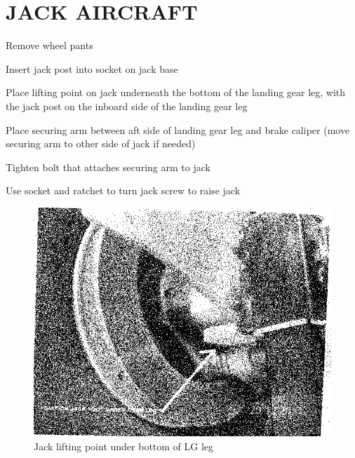 \section{JACK AIRCRAFT}
  \begin{enumerate*}
  	\item Remove wheel pants
    \item Insert jack post into socket on jack base
    \item Place lifting point on jack underneath the bottom of the landing gear leg, with the jack post on the inboard side of the landing gear leg
    \item Place securing arm between aft side of landing gear leg and brake caliper (move securing arm to other side of jack if needed)
    \item Tighten bolt that attaches securing arm to jack
    \item Use socket and ratchet to turn jack screw to raise jack
  \end{enumerate*}

\begin{figure}
[htb]
\begin{center}
\includegraphics[scale=1]{../Diagrams/Jack_Instructions_1}
\end{center}
\caption{Jack lifting point under bottom of LG leg}
\end{figure}

